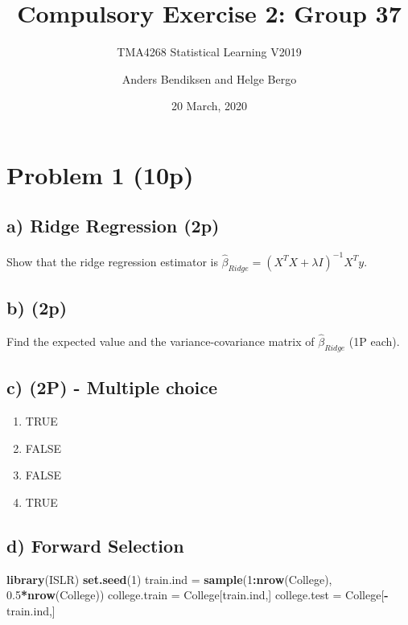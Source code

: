 \documentclass[]{article}
\title{Compulsory Exercise 2: Group 37}
\subtitle{TMA4268 Statistical Learning V2019}
\author{Anders Bendiksen and Helge Bergo}
\date{20 March, 2020}
\newenvironment{Shaded}{\begin{snugshade}}{\end{snugshade}}
\newcommand{\DecValTok}[1]{\textcolor[rgb]{0.00,0.00,0.81}{#1}}
\newcommand{\FloatTok}[1]{\textcolor[rgb]{0.00,0.00,0.81}{#1}}
\newcommand{\KeywordTok}[1]{\textcolor[rgb]{0.13,0.29,0.53}{\textbf{#1}}}
\newcommand{\NormalTok}[1]{#1}
\newcommand{\OperatorTok}[1]{\textcolor[rgb]{0.81,0.36,0.00}{\textbf{#1}}}
\newcommand{\StringTok}[1]{\textcolor[rgb]{0.31,0.60,0.02}{#1}}
\providecommand{\tightlist}{%
  \setlength{\itemsep}{0pt}\setlength{\parskip}{0pt}}
\begin{document}
\maketitle

\hypertarget{problem-1-10p}{%
\section{Problem 1 (10p)}\label{problem-1-10p}}

\hypertarget{a-ridge-regression-2p}{%
\subsection{a) Ridge Regression (2p)}\label{a-ridge-regression-2p}}

Show that the ridge regression estimator is
\(\hat\beta_{Ridge} = (X^T X + \lambda I)^{-1} X^T y\).

\hypertarget{b-2p}{%
\subsection{b) (2p)}\label{b-2p}}

Find the expected value and the variance-covariance matrix of
\(\hat\beta_{Ridge}\) (1P each).

\hypertarget{c-2p---multiple-choice}{%
\subsection{c) (2P) - Multiple choice}\label{c-2p---multiple-choice}}

\begin{enumerate}
\def\labelenumi{(\roman{enumi})}
\tightlist
\item
  TRUE
\item
  FALSE
\item
  FALSE
\item
  TRUE
\end{enumerate}

\hypertarget{d-forward-selection}{%
\subsection{d) Forward Selection}\label{d-forward-selection}}

\begin{Shaded}
\begin{Highlighting}[]
\KeywordTok{library}\NormalTok{(ISLR)}
\KeywordTok{set.seed}\NormalTok{(}\DecValTok{1}\NormalTok{)}
\NormalTok{train.ind =}\StringTok{ }\KeywordTok{sample}\NormalTok{(}\DecValTok{1}\OperatorTok{:}\KeywordTok{nrow}\NormalTok{(College), }\FloatTok{0.5}\OperatorTok{*}\KeywordTok{nrow}\NormalTok{(College))}
\NormalTok{college.train =}\StringTok{ }\NormalTok{College[train.ind,]}
\NormalTok{college.test =}\StringTok{ }\NormalTok{College[}\OperatorTok{-}\NormalTok{train.ind,]}
\end{Highlighting}
\end{Shaded}
\end{document}
